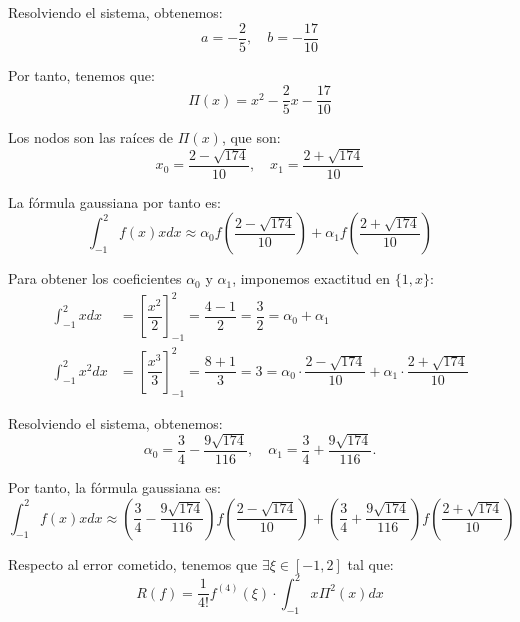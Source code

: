 \begin{ejercicio}
\begin{enumerate}
        Resolviendo el sistema, obtenemos:
        \begin{equation*}
            a = -\frac{2}{5}, \quad b = -\frac{17}{10}
        \end{equation*}

        Por tanto, tenemos que:
        \begin{equation*}
            \Pi(x) = x^2 - \frac{2}{5}x - \frac{17}{10}
        \end{equation*}

        Los nodos son las raíces de $\Pi(x)$, que son:
        \begin{equation*}
            x_0 = \dfrac{2-\sqrt{174}}{10}, \quad x_1 = \dfrac{2+\sqrt{174}}{10}
        \end{equation*}

        La fórmula gaussiana por tanto es:
        \begin{equation*}
            \int_{-1}^{2} f(x)x dx \approx \alpha_0 f\left(\dfrac{2-\sqrt{174}}{10}\right) + \alpha_1 f\left(\dfrac{2+\sqrt{174}}{10}\right)
        \end{equation*}

        Para obtener los coeficientes $\alpha_0$ y $\alpha_1$, imponemos exactitud en $\{1, x\}$:
        \begin{align*}
            \int_{-1}^{2} x dx &= \left[\dfrac{x^2}{2}\right]_{-1}^{2} = \dfrac{4-1}{2} = \dfrac{3}{2} = \alpha_0 + \alpha_1\\
            \int_{-1}^{2} x^2 dx &= \left[\dfrac{x^3}{3}\right]_{-1}^{2} = \dfrac{8+1}{3} = 3 = \alpha_0\cdot \dfrac{2-\sqrt{174}}{10} + \alpha_1\cdot \dfrac{2+\sqrt{174}}{10}
        \end{align*}

        Resolviendo el sistema, obtenemos:
        \begin{equation*}
            \alpha_0 = \dfrac{3}{4}-\dfrac{9\sqrt{174}}{116}, \quad
            \alpha_1 = \dfrac{3}{4}+\dfrac{9\sqrt{174}}{116}.
        \end{equation*}

        Por tanto, la fórmula gaussiana es:
        \begin{equation*}
            \int_{-1}^{2} f(x)x dx \approx \left(\dfrac{3}{4}-\dfrac{9\sqrt{174}}{116}\right)f\left(\dfrac{2-\sqrt{174}}{10}\right) + \left(\dfrac{3}{4}+\dfrac{9\sqrt{174}}{116}\right)f\left(\dfrac{2+\sqrt{174}}{10}\right)
        \end{equation*}

        Respecto al error cometido, tenemos que $\exists \xi\in [-1,2]$ tal que:
        \begin{equation*}
            R(f) = \dfrac{1}{4!}f^{(4)}(\xi)\cdot \int_{-1}^{2} x\Pi^2(x)dx
        \end{equation*}


\end{enumerate}
\end{ejercicio}
